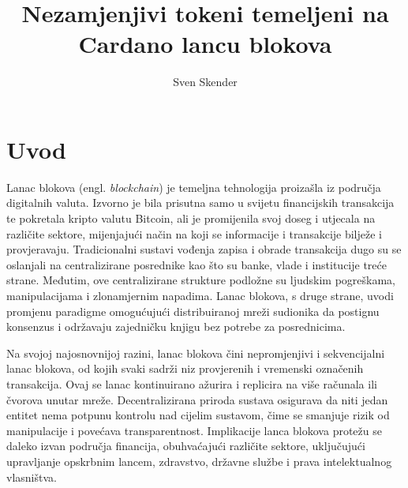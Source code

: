 \documentclass[times, utf8, diplomski]{fer}
\begin{document}

\title{Nezamjenjivi tokeni temeljeni na Cardano lancu blokova}

\author{Sven Skender}

\maketitle

\izvornik


\tableofcontents

\chapter{Uvod}

Lanac blokova (engl. \emph{blockchain}) je temeljna tehnologija proizašla iz područja digitalnih valuta. Izvorno je bila prisutna samo u svijetu financijskih transakcija te pokretala kripto valutu Bitcoin, ali je promijenila svoj doseg i utjecala na različite sektore, mijenjajući način na koji se informacije i transakcije bilježe i provjeravaju. Tradicionalni sustavi vođenja zapisa i obrade transakcija dugo su se oslanjali na centralizirane posrednike kao što su banke, vlade i institucije treće strane. Međutim, ove centralizirane strukture podložne su ljudskim pogreškama, manipulacijama i zlonamjernim napadima. Lanac blokova, s druge strane, uvodi promjenu paradigme omogućujući distribuiranoj mreži sudionika da postignu konsenzus i održavaju zajedničku knjigu bez potrebe za posrednicima.

Na svojoj najosnovnijoj razini, lanac blokova čini nepromjenjivi i sekvencijalni lanac blokova, od kojih svaki sadrži niz provjerenih i vremenski označenih transakcija. Ovaj se lanac kontinuirano ažurira i replicira na više računala ili čvorova unutar mreže. Decentralizirana priroda sustava osigurava da niti jedan entitet nema potpunu kontrolu nad cijelim sustavom, čime se smanjuje rizik od manipulacije i povećava transparentnost. Implikacije lanca blokova protežu se daleko izvan područja financija, obuhvaćajući različite sektore, uključujući upravljanje opskrbnim lancem, zdravstvo, državne službe i prava intelektualnog vlasništva.
\end{document}
